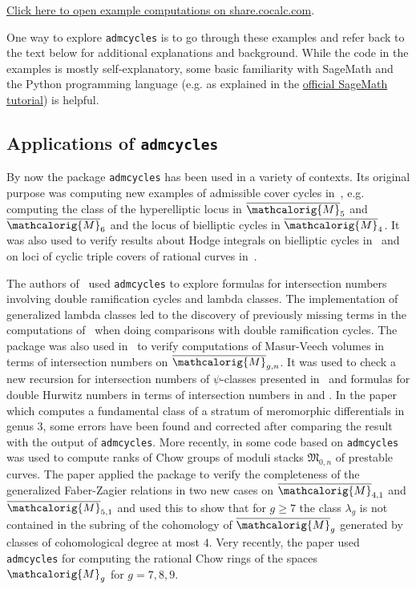 \documentclass[11pt]{article}
\newcommand{\Sage}{SageMath}
\newcommand{\admcycles}{\texttt{admcycles}}
\begin{document}
\begin{center}
\href{https://share.cocalc.com/share/0a48957b67f375b9e3107216504ca0c4efb678fd/admcycles%20tutorial.ipynb?viewer=share}{Click here to open example computations on share.cocalc.com}.
\end{center}
One way to explore \admcycles{} is to go through these examples and refer back to the text below for additional explanations and background.
While the code in the examples is mostly self-explanatory, some basic familiarity with \Sage{} and the Python programming language (e.g. as explained in the \href{https://doc.sagemath.org/html/en/tutorial/index.html}{official \Sage{} tutorial}) is helpful.

\subsection*{Applications of \admcycles{}}
By now the package \admcycles{} has been used in a variety of contexts. Its original purpose was computing new examples of admissible cover cycles in~\cite{schmittvanzelm}, e.g. computing the class of the hyperelliptic locus in $\overline{\mathcalorig{M}}_5$ and $\overline{\mathcalorig{M}}_6$ and the locus of bielliptic cycles in $\overline{\mathcalorig{M}}_4$. It was also used to verify results about Hodge integrals on bielliptic cycles in~\cite{hurwitzhodge} and on loci of cyclic triple covers of rational curves in~\cite{somerstep}.

The authors of~\cite{rossiburyak} used \admcycles{} to explore formulas for intersection numbers involving double ramification cycles and lambda classes. The implementation of generalized lambda classes led to the discovery of previously missing terms in the computations of~\cite{PRvZ} when doing comparisons with double ramification cycles. The package was also used in~\cite{2019arXiv191202267C} to verify computations of Masur-Veech volumes in terms of intersection numbers on $\overline{\mathcalorig{M}}_{g,n}$. It was used to check a new recursion for intersection numbers of $\psi$-classes presented in~\cite{2019arXiv190312526G} and formulas for double Hurwitz numbers in terms of intersection numbers in \cite{Hurwitznum1} and \cite{Hurwitznum2}. In the paper \cite{castorenagendron} which computes a fundamental class of a stratum of meromorphic differentials in genus $3$, some errors have been found and corrected after comparing the result with the output of \admcycles{}.
More recently, in \cite{BaeSchmitt} some code based on \admcycles{} was used to compute ranks of Chow groups of moduli stacks $\mathfrak{M}_{0,n}$ of prestable curves. 
The paper \cite{lambdaformula} applied the package to verify the completeness of the generalized Faber-Zagier relations in two new cases on $\overline{\mathcalorig{M}}_{4,1}$ and $\overline{\mathcalorig{M}}_{5,1}$ and used this to show that for $g \geq 7$ the class $\lambda_g$ is not contained in the subring of the cohomology of $\overline{\mathcalorig{M}}_{g}$ generated by classes of cohomological degree at most $4$.
Very recently, the paper \cite{canninglarson} used \texttt{admcycles} for computing the rational Chow rings of the spaces $\mathcalorig{M}_g$ for $g=7,8,9$.
\end{document}
